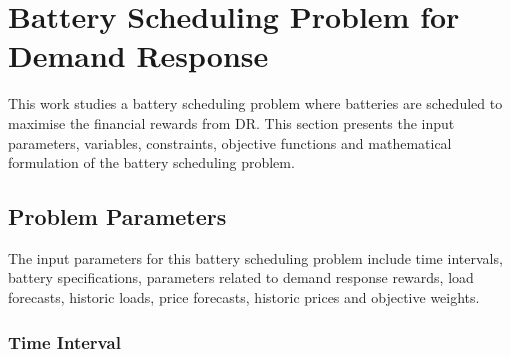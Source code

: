 

%
%	
%	
%	
%	

\section{Battery Scheduling Problem for Demand Response}
\label{dr:prob}

This work studies a battery scheduling problem where batteries are scheduled to maximise the financial rewards from \gls{DR}. 
This section presents the input parameters, variables, constraints, objective functions and mathematical formulation of the battery scheduling problem. 

\subsection{Problem Parameters}

The input parameters for this battery scheduling problem include time intervals, battery specifications, parameters related to demand response rewards, load forecasts, historic loads, price forecasts, historic prices and objective weights. 

\subsubsection{Time Interval}

